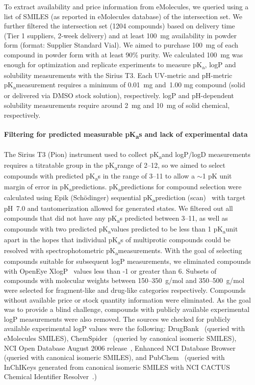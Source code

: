 \documentclass[9pt,lineno]{elife}
\newcommand{\pKa}{pK\textsubscript{a}}
\begin{document}
To extract availability and price information from eMolecules, we queried using a list of SMILES (as reported in eMolecules database) of the intersection set. 
We further filtered the intersection set (1204 compounds) based on delivery time (Tier 1 suppliers, 2-week delivery) and at least 100~mg availability in powder form (format: Supplier Standard Vial).  We aimed to purchase 100~mg of each compound in powder form with at least 90\% purity. We calculated 100~mg was enough for optimization and replicate experiments to measure \pKa, logP and solubility measurements with the Sirius T3. 
Each UV-metric and pH-metric \pKa measurement requires a minimum of 0.01~mg and~1.00 mg compound (solid or delivered via DMSO stock solution), respectively. 
logP and pH-dependent solubility measurements require around 2~mg and 10~mg of solid chemical, respectively. 

\paragraph{Filtering for predicted measurable \pKa s and lack of experimental data}

The Sirius T3 (Pion) instrument used to collect \pKa and logP/logD measurements requires a titratable group in the \pKa range of 2--12, so we aimed to select compounds with predicted \pKa s in the range of 3--11 to allow a $\sim$1 pK unit margin of error in \pKa predictions. 
\pKa predictions for compound selection were calculated using Epik (Sch\"{o}dinger) sequential \pKa prediction (scan)~\citep{shelley_epik:_2007,schrodinger_epik_v3_8} with target pH~7.0 and tautomerization allowed for generated states. 
We filtered out all compounds that did not have any \pKa s predicted between 3--11, as well as compounds with two predicted \pKa values predicted to be less than 1 \pKa unit apart in the hopes that individual \pKa s of multiprotic compounds could be resolved with spectrophotometric \pKa measurements. 
With the goal of selecting compounds suitable for subsequent logP measurements, we eliminated compounds with OpenEye XlogP~\citep{oemolprop_openeye_2017} values less than -1 or greater than 6. 
Subsets of compounds with molecular weights between 150--350~g/mol and 350--500~g/mol were selected for fragment-like and drug-like categories respectively. 
Compounds without available price or stock quantity information were eliminated. 
As the goal was to provide a blind challenge, compounds with publicly available experimental logP measurements were also removed.
The sources we checked for publicly available experimental logP values were the following: DrugBank~\citep{wishart_drugbank:_2006} (queried with eMolecules SMILES), ChemSpider~\citep{pence_chemspider:_2010} (queried by canonical isomeric SMILES), NCI Open Database August 2006 release~\citep{nci_open_database_2006}, Enhanced NCI Database Browser~\citep{nci_database_browser} (queried with canonical isomeric SMILES), and PubChem~\citep{kim_pubchem_2016} (queried with InChIKeys generated from canonical isomeric SMILES with NCI CACTUS Chemical Identifier Resolver~\citep{nci_chem_id_resolver}.)
\end{document}
